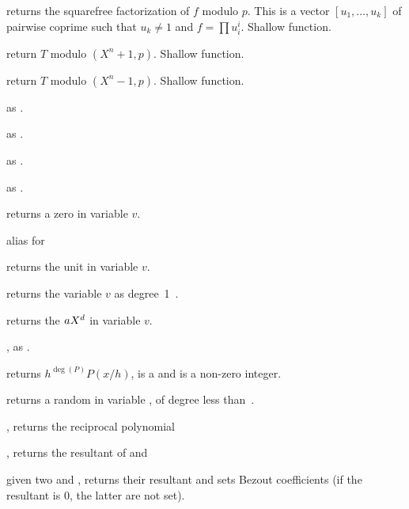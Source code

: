  returns the squarefree
factorization of $f$ modulo $p$. This is a vector $[u_1,\dots,u_k]$
of pairwise coprime  such that $u_k \neq 1$ and $f = \prod u_i^i$.
Shallow function.

 return $T$ modulo
$(X^n + 1, p)$. Shallow function.

 return $T$ modulo
$(X^n - 1, p)$. Shallow function.

 as .

 as
.

 as .

 as .


 returns a zero  in variable $v$.

 alias for 

 returns the unit  in variable $v$.

 returns the variable $v$ as degree~1~.

 returns the 
$a\*X^d$ in variable $v$.

, as .

 returns $h^{\deg(P)} P(x/h)$,
 is a  and  is a non-zero integer.

 returns a random 
in variable , of degree less than~.

, returns the reciprocal polynomial

, returns the resultant
of  and 

given two   and ,
returns their resultant and sets Bezout coefficients (if the resultant is 0,
the latter are not set).

